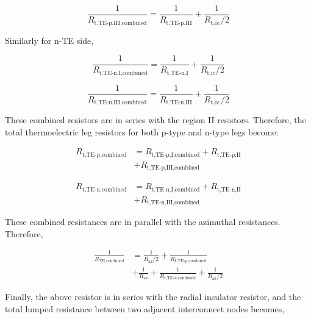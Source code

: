 \documentclass[10pt,a4paper,twocolumn]{article}
\begin{document}
\begin{equation}
  \frac{1}{R_{\text{t,TE-p,III,combined}}} = \frac{1}{R_{\text{t,TE-p,III}}} + \frac{1}{R_{\text{t,oc}}/2}
\end{equation}

Similarly for n-TE side,

\begin{equation}
  \frac{1}{R_{\text{t,TE-n,I,combined}}} = \frac{1}{R_{\text{t,TE-n,I}}} + \frac{1}{R_{\text{t,ic}}/2}
\end{equation}

\begin{equation}
  \frac{1}{R_{\text{t,TE-n,III,combined}}} = \frac{1}{R_{\text{t,TE-n,III}}} + \frac{1}{R_{\text{t,oc}}/2}
\end{equation}

These combined resistors are in series with the region II resistors. Therefore, the total thermoelectric leg resistors for both p-type and n-type legs become:

\begin{equation}
  \begin{aligned}
    R_{\text{t,TE-p,combined}} &= R_{\text{t,TE-p,I,combined}} + R_{\text{t,TE-p,II}}\\ &+ R_{\text{t,TE-p,III,combined}}
  \end{aligned}
\end{equation}

\begin{equation}
  \begin{aligned}
    R_{\text{t,TE-n,combined}} &= R_{\text{t,TE-n,I,combined}} + R_{\text{t,TE-n,II}}\\ & + R_{\text{t,TE-n,III,combined}}
  \end{aligned}
\end{equation}

These combined resistances are in parallel with the azimuthal resistances. Therefore,

\begin{equation}
  \begin{aligned}
    \frac{1}{R_{\text{TE,combined}}}  &= \frac{1}{R_{\text{az}}/2} + \frac{1}{R_{\text{t,TE-p,combined}}} \\ &+ \frac{1}{R_{\text{az}}} + \frac{1}{R_{\text{t,TE-n,combined}}} +  \frac{1}{R_{\text{az}}/2}
  \end{aligned}
\end{equation}

Finally, the above resistor is in series with the radial insulator resistor, and the total lumped resistance between two adjacent interconnect nodes becomes,
\end{document}
